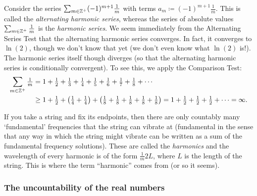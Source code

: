 \begin{exm}
Consider the series $\sum _{m\in \mathbb{Z} ^+}(-1)^{m+1}\frac{1}{m}$ with terms $a_m\coloneqq (-1)^{m+1}\frac{1}{m}$.  This is called the \emph{alternating harmonic series}, whereas the series of absolute values $\sum _{m\in \mathbb{Z} ^+}\frac{1}{m}$ is the \emph{harmonic series}.  We seem immediately from the Alternating Series Test that the alternating harmonic series converges.  In fact, it converges to $\ln (2)$, though we don't know that yet (we don't even know what $\ln (2)$ is!).  The harmonic series itself though diverges (so that the alternating harmonic series is conditionally convergent).  To see this, we apply the Comparison Test:
\begin{equation}
\begin{split}
\sum _{m\in \mathbb{Z} ^+}\tfrac{1}{m} & =1+\tfrac{1}{2}+\tfrac{1}{3}+\tfrac{1}{4}+\tfrac{1}{5}+\tfrac{1}{6}+\tfrac{1}{7}+\tfrac{1}{8}+\cdots \\
& \geq 1+\tfrac{1}{2}+\left( \tfrac{1}{4}+\tfrac{1}{4}\right) +\left( \tfrac{1}{8}+\tfrac{1}{8}+\tfrac{1}{8}+\tfrac{1}{8}+\tfrac{1}{8}\right) =1+\tfrac{1}{2}+\tfrac{1}{2}+\tfrac{1}{2}+\cdots =\infty .
\end{split}
\end{equation}
\begin{rmk}
If you take a string and fix its endpoints, then there are only countably many `fundamental' frequencies that the string can vibrate at (fundamental in the sense that any way in which the string might vibrate can be written as a sum of the fundamental frequency solutions).  These are called the \emph{harmonics} and the wavelength of every harmonic is of the form $\frac{1}{m}2L$, where $L$ is the length of the string.  This is where the term ``harmonic'' comes from (or so it seems).
\end{rmk}
\end{exm}

\subsubsection{The uncountability of the real numbers}

